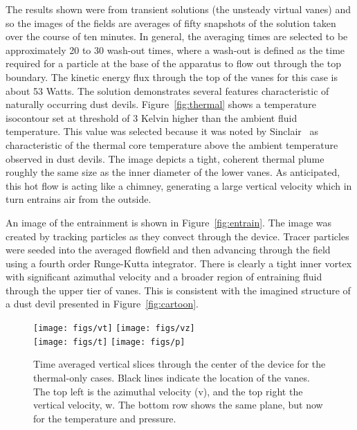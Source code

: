 The results shown were from transient solutions (the unsteady virtual
vanes) and so the images of the fields are averages of fifty snapshots
of the solution taken over the course of ten minutes. In general, the
averaging times are selected to be approximately 20 to 30 wash-out
times, where a wash-out is defined as the time required for a particle
at the base of the apparatus to flow out through the top boundary. The
kinetic energy flux through the top of the vanes for this case is about
53 Watts. The solution demonstrates several features characteristic of
naturally occurring dust devils. Figure~\ref{fig:thermal} shows a
temperature isocontour set at threshold of 3 Kelvin higher than the
ambient fluid temperature. This value was selected because it was noted
by Sinclair~\cite{Sinclair1969} as characteristic of the thermal core 
temperature above the ambient temperature observed in dust devils. The
image depicts a tight, coherent thermal plume roughly the same size as
the inner diameter of the lower vanes. As anticipated, this hot flow is
acting like a chimney, generating a large vertical velocity which in
turn entrains air from the outside.  

An image of the entrainment is shown in Figure~\ref{fig:entrain}. The
image was created by tracking particles as they convect through the
device. Tracer particles were seeded into the averaged flowfield and
then advancing through the field using a fourth order Runge-Kutta integrator.  
There is clearly a tight inner vortex with significant azimuthal
velocity and a broader region of entraining fluid through the upper tier
of vanes. This is consistent with the imagined structure of a dust devil
presented in Figure~\ref{fig:cartoon}.    

\begin{figure}[htb]

 \centering
 \texttt{[image: figs/vt]}
 \hfill
  \texttt{[image: figs/vz]}
 \\
  \centering
  \texttt{[image: figs/t]}
 \hfill
 \texttt{[image: figs/p]}
 \caption{Time averaged vertical slices through the center of the device
 for the thermal-only cases. Black lines indicate the location of the
 vanes. The top left is the azimuthal velocity (v), and the top right
 the vertical velocity, w. The bottom row shows the same plane, but now for the
 temperature and pressure.} 
 \label{fig:to-vert}
\end{figure}

